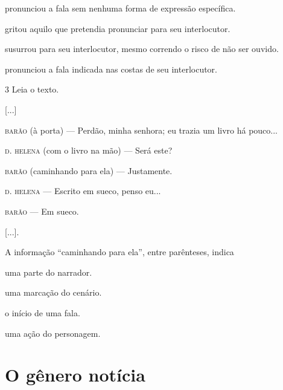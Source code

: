 \begin{escolha}
\item pronunciou a fala sem nenhuma forma de expressão específica.

\item gritou aquilo que pretendia pronunciar para seu interlocutor.

\item susurrou para seu interlocutor, mesmo correndo o risco de não ser ouvido.

\item pronunciou a fala indicada nas costas de seu interlocutor.
\end{escolha}



\num{3} Leia o texto.

\begin{myquote}
{[}...{]}

\textsc{barão} (à porta) — Perdão, minha senhora; eu trazia um livro há
pouco...

\textsc{d. helena} (com o livro na mão) — Será este?

\textsc{barão} (caminhando para ela) — Justamente.

\textsc{d. helena} — Escrito em sueco, penso eu...

\textsc{barão} — Em sueco.

{[}...{]}.
\end{myquote}


A informação “caminhando para ela”, entre parênteses, indica

\begin{minipage}{.5\textwidth}
\begin{escolha}
\item uma parte do narrador.

\item uma marcação do cenário.

\item o início de uma fala.

\item uma ação do personagem.
\end{escolha}
\end{minipage}


\chapter{O gênero notícia}

